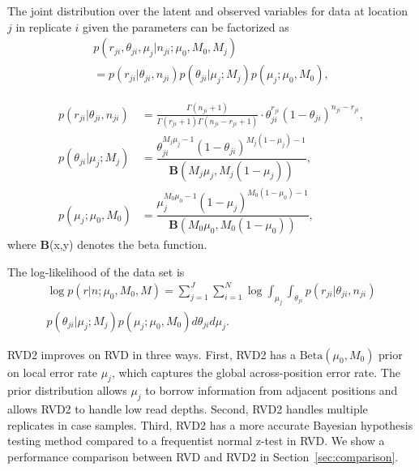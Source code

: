 \documentclass{bioinfo}
\begin{document}
The joint distribution over the latent and observed variables for data at location $j$ in replicate $i$ given the parameters can be factorized as
\begin{multline}\label{eqn:jointpdf}
p \left( r_{ji}, \theta_{ji}, \mu_j | n_{ji}; \mu_0, M_0, M_j \right) \\ = p \left( r_{ji} | \theta_{ji}, n_{ji} \right) p\left( \theta_{ji} | \mu_j; M_j \right) p\left( \mu_j; \mu_0, M_0 \right),
\end{multline}

\begin{align}\nonumber
  p\left( r_{ji} | \theta_{ji}, n_{ji} \right) &= \frac{ \Gamma(n_{ji}+1) } { \Gamma(r_{ji}+1) \Gamma( n_{ji} - r_{ji} + 1 ) } \cdot \theta_{ji}^{r_{ji}} (1 - \theta_{ji})^{n_{ji} - r_{ji}}, \nonumber \\
  p\left( \theta_{ji} | \mu_j; M_j \right) &= \dfrac{ \theta_{ji}^{M_j\mu_j -1} (1 - \theta_{ji})^{M_j ( 1 - \mu_j) - 1}}{\textbf{B}(M_j \mu_j, M_j (1-\mu_j))}, \nonumber \\
  p\left( \mu_j; \mu_0, M_0 \right)  &= \dfrac{\mu_j^{M_0\mu_0 -1} (1 - \mu_j)^{M_0 ( 1 - \mu_0) - 1}}{\textbf{B}(M_0 \mu_0,M_0 (1-\mu_0) )}, \nonumber 
\end{align}
where \textbf{B}(x,y) denotes the beta function.

The log-likelihood of the data set is
\begin{multline}
\log p \left( r | n ; \mu_0, M_0, M \right) = \sum_{j=1}^J \sum_{i=1}^N \log \int_{\mu_j} \int_{\theta_{ji}}  p \left( r_{ji} | \theta_{ji}, n_{ji} \right) \\ p\left( \theta_{ji} | \mu_j; M_j \right) p\left( \mu_j; \mu_0, M_0 \right) d\theta_{ji} d\mu_j.
\end{multline}

\label{Improvement of RVD2}
RVD2 improves on RVD in three ways. First, RVD2 has a $ \text{Beta}(\mu_0, M_0) $ prior on local error rate $ \mu_j $, which captures the global across-position error rate. The prior distribution allows $ \mu_j $ to borrow information from adjacent positions and allows RVD2 to handle low read depths. Second, RVD2 handles multiple replicates in case samples. Third, RVD2 has a more accurate Bayesian hypothesis testing method compared to a frequentist normal z-test in RVD. We show a performance comparison between RVD and RVD2 in Section~\ref{sec:comparison}.
\end{document}

